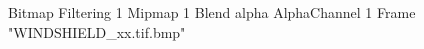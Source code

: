 {Bitmap
	{Filtering 1}
	{Mipmap 1}
	{Blend alpha}
	{AlphaChannel 1}
	{Frame "WINDSHIELD_xx.tif.bmp"}
}
